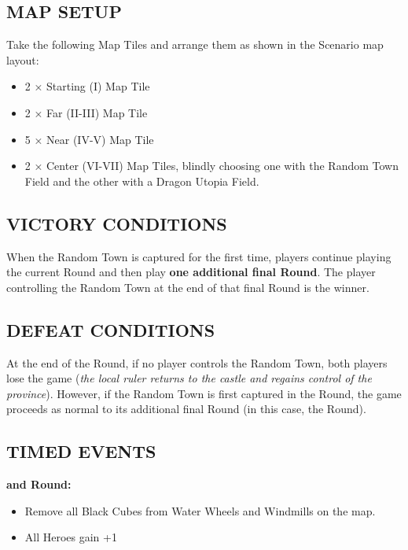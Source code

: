 \begin{multicols*}{2}
\subsection*{\MakeUppercase{Map Setup}}
Take the following Map Tiles and arrange them as shown in the Scenario map layout:
\begin{itemize}
  \item 2 × Starting (I) Map Tile
  \item 2 × Far (II-III) Map Tile
  \item 5 × Near (IV-V) Map Tile
  \item 2 × Center (VI-VII) Map Tiles, blindly choosing one with the Random Town Field and the other with a Dragon Utopia Field.
\end{itemize}

\subsection*{\MakeUppercase{Victory Conditions}}
When the Random Town is captured for the first time, players continue playing the current Round and then play \textbf{one additional final Round}.
The player controlling the Random Town at the end of that final Round is the winner.

\subsection*{\MakeUppercase{Defeat Conditions}}
At the end of the  Round, if no player controls the Random Town, both players lose the game (\textit{the local ruler returns to the castle and regains control of the province}).
However, if the Random Town is first captured in the  Round, the game proceeds as normal to its additional final Round (in this case, the  Round).

\subsection*{\MakeUppercase{Timed Events}}

  \textbf{ and  Round:}
\begin{itemize}
  \item Remove all Black Cubes from Water Wheels and Windmills on the map.
  \item All Heroes gain +1 
\end{itemize}

\end{multicols*}

